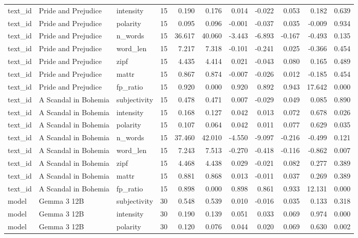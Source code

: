 \documentclass[10pt]{article}
\begin{document}
{\begin{longtable}{lllrrrrrrrr}
text\_id & Pride and Prejudice & intensity & 15 & 0.190 & 0.176 & 0.014 & -0.022 & 0.053 & 0.182 & 0.639 \\
text\_id & Pride and Prejudice & polarity & 15 & 0.095 & 0.096 & -0.001 & -0.037 & 0.035 & -0.009 & 0.934 \\
text\_id & Pride and Prejudice & n\_words & 15 & 36.617 & 40.060 & -3.443 & -6.893 & -0.167 & -0.493 & 0.135 \\
text\_id & Pride and Prejudice & word\_len & 15 & 7.217 & 7.318 & -0.101 & -0.241 & 0.025 & -0.366 & 0.454 \\
text\_id & Pride and Prejudice & zipf & 15 & 4.435 & 4.414 & 0.021 & -0.043 & 0.080 & 0.165 & 0.489 \\
text\_id & Pride and Prejudice & mattr & 15 & 0.867 & 0.874 & -0.007 & -0.026 & 0.012 & -0.185 & 0.454 \\
text\_id & Pride and Prejudice & fp\_ratio & 15 & 0.920 & 0.000 & 0.920 & 0.892 & 0.943 & 17.642 & 0.000 \\
text\_id & A Scandal in Bohemia & subjectivity & 15 & 0.478 & 0.471 & 0.007 & -0.029 & 0.049 & 0.085 & 0.890 \\
text\_id & A Scandal in Bohemia & intensity & 15 & 0.168 & 0.127 & 0.042 & 0.013 & 0.072 & 0.678 & 0.026 \\
text\_id & A Scandal in Bohemia & polarity & 15 & 0.107 & 0.064 & 0.042 & 0.011 & 0.077 & 0.629 & 0.035 \\
text\_id & A Scandal in Bohemia & n\_words & 15 & 37.460 & 42.010 & -4.550 & -9.097 & -0.216 & -0.499 & 0.121 \\
text\_id & A Scandal in Bohemia & word\_len & 15 & 7.243 & 7.513 & -0.270 & -0.418 & -0.116 & -0.862 & 0.007 \\
text\_id & A Scandal in Bohemia & zipf & 15 & 4.468 & 4.438 & 0.029 & -0.021 & 0.082 & 0.277 & 0.389 \\
text\_id & A Scandal in Bohemia & mattr & 15 & 0.881 & 0.868 & 0.013 & -0.011 & 0.037 & 0.269 & 0.389 \\
text\_id & A Scandal in Bohemia & fp\_ratio & 15 & 0.898 & 0.000 & 0.898 & 0.861 & 0.933 & 12.131 & 0.000 \\
model & Gemma 3 12B & subjectivity & 30 & 0.548 & 0.539 & 0.010 & -0.016 & 0.035 & 0.133 & 0.318 \\
model & Gemma 3 12B & intensity & 30 & 0.190 & 0.139 & 0.051 & 0.033 & 0.069 & 0.974 & 0.000 \\
model & Gemma 3 12B & polarity & 30 & 0.120 & 0.076 & 0.044 & 0.020 & 0.069 & 0.630 & 0.002 \\

\end{longtable}}
\end{document}
